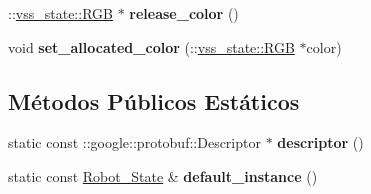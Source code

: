 \begin{DoxyCompactItemize}
\item 
\+::\hyperlink{classvss__state_1_1RGB}{vss\+\_\+state\+::\+R\+GB} $\ast$ {\bfseries release\+\_\+color} ()\hypertarget{classvss__state_1_1Robot__State_aba8a8ff5aa02a978e3ff2e8b6335f0ce}{}\label{classvss__state_1_1Robot__State_aba8a8ff5aa02a978e3ff2e8b6335f0ce}

\item 
void {\bfseries set\+\_\+allocated\+\_\+color} (\+::\hyperlink{classvss__state_1_1RGB}{vss\+\_\+state\+::\+R\+GB} $\ast$color)\hypertarget{classvss__state_1_1Robot__State_a368a1f90ce946cd075aa050885e1e6d3}{}\label{classvss__state_1_1Robot__State_a368a1f90ce946cd075aa050885e1e6d3}

\end{DoxyCompactItemize}
\subsection*{Métodos Públicos Estáticos}
\begin{DoxyCompactItemize}
\item 
static const \+::google\+::protobuf\+::\+Descriptor $\ast$ {\bfseries descriptor} ()\hypertarget{classvss__state_1_1Robot__State_af15c0b33b2edbd683bfb87c76e9b94b7}{}\label{classvss__state_1_1Robot__State_af15c0b33b2edbd683bfb87c76e9b94b7}

\item 
static const \hyperlink{classvss__state_1_1Robot__State}{Robot\+\_\+\+State} \& {\bfseries default\+\_\+instance} ()\hypertarget{classvss__state_1_1Robot__State_aa14ffa0e9a4e47e1c824b2c82039b02c}{}\label{classvss__state_1_1Robot__State_aa14ffa0e9a4e47e1c824b2c82039b02c}

\end{DoxyCompactItemize}
